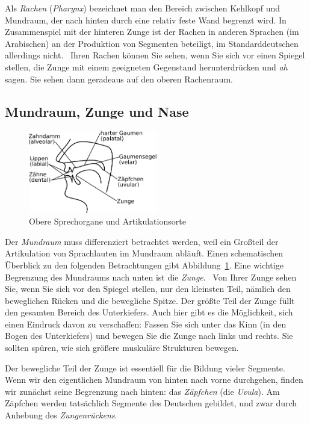 Als \textit{Rachen} (\textit{Pharynx}) bezeichnet man den Bereich zwischen Kehlkopf und Mundraum, der nach hinten durch eine relativ feste Wand begrenzt wird.
In Zusammenspiel mit der hinteren Zunge ist der Rachen in anderen Sprachen (\zB im Arabischen) an der Produktion von Segmenten beteiligt, im Standarddeutschen allerdings nicht.
\TuBegin~Ihren Rachen können Sie sehen, wenn Sie sich vor einen Spiegel stellen, die Zunge mit einem geeigneten Gegenstand herunterdrücken und \textit{ah} sagen.
Sie sehen dann geradeaus auf den oberen Rachenraum.

\subsection{Mundraum, Zunge und Nase}

\begin{figure}[!htbp]
  \centering
  \includegraphics[width=0.5\textwidth]{figures/mundraum}
  \caption[Obere Sprechorgane und Artikulationsorte]{Obere Sprechorgane und Artikulationsorte}
  \label{fig:oberesprechorgane}
\end{figure}

Der \textit{Mundraum} muss differenziert betrachtet werden, weil ein Großteil der Artikulation von Sprachlauten im Mundraum abläuft.
Einen schematischen Überblick zu den folgenden Betrachtungen gibt Abbildung~\ref{fig:oberesprechorgane}.
Eine wichtige Begrenzung des Mundraums nach unten ist die \textit{Zunge}.
\TuBegin~Von Ihrer Zunge sehen Sie, wenn Sie sich vor den Spiegel stellen, nur den kleinsten Teil, nämlich den beweglichen Rücken und die bewegliche Spitze.
Der größte Teil der Zunge füllt den gesamten Bereich des Unterkiefers.
Auch hier gibt es die Möglichkeit, sich einen Eindruck davon zu verschaffen:
Fassen Sie sich unter das Kinn (in den Bogen des Unterkiefers) und bewegen Sie die Zunge nach links und rechts.
Sie sollten spüren, wie sich größere muskuläre Strukturen bewegen.

Der bewegliche Teil der Zunge ist essentiell für die Bildung vieler Segmente.
Wenn wir den eigentlichen Mundraum von hinten nach vorne durchgehen, finden wir zunächst seine Begrenzung nach hinten: das \textit{Zäpfchen} (die \textit{Uvula}).
Am Zäpfchen werden tatsächlich Segmente des Deutschen gebildet, und zwar durch Anhebung des \textit{Zungenrückens}.

